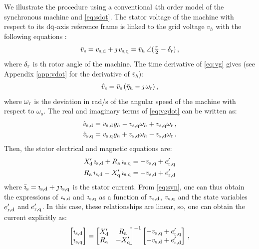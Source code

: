 \documentclass[journal, twocolumn, letter]{IEEEtran}
\newcommand{\dx}[1]{#1_{\rm d}}
\newcommand{\qx}[1]{#1_{\rm q}}
\newcommand{\ds}[1]{#1_{\rm s, d}}
\newcommand{\qs}[1]{#1_{\rm s, q}}
\newcommand{\dr}[1]{#1_{\rm r, d}}
\newcommand{\qr}[1]{#1_{\rm r, q}}
\newcommand{\vh}{v_h}
\newcommand{\dg}{\delta_{\rm r}}
\newcommand{\wg}{\omega_{\rm r}}
\newcommand{\vg}{\bar{v}_{\rm s}}
\newcommand{\vgdot}{\dot{\bar{v}}_{\rm s}}
\newcommand{\ig}{\bar{\ii}_{\rm s}}
\newcommand{\vhbar}{\bar{v}_h}
\newcommand{\etah}{\bar{\eta}_h}
\newcommand{\rhoh}{\varrho_h}
\newcommand{\wh}{\omega_h}
\newcommand{\wo}{\omega_o}
\newcommand{\ii}{\imath}
\newcommand{\jj}{\jmath}
\begin{document}
We illustrate the procedure using a conventional 4th order model of
the synchronous machine and \eqref{eq:sdot}.  The stator voltage of
the machine with respect to its $\rm dq$-axis reference frame is
linked to the grid voltage $\vh$ with the following equations
\cite{Sauer:1998}:
\begin{equation}
  \label{eq:vg}
  \vg = \ds{v} + \jj \, \qs{v} =
  \vhbar \, \angle (\tfrac{\pi}{2} - \dg) \, ,
\end{equation}
where $\dg$ is th rotor angle of the machine.  The time derivative of
\eqref{eq:vg} gives (see Appendix \ref{app:vdot} for the derivative of
$\vhbar$):
\begin{equation}
  \label{eq:vgdot}
  \vgdot = \vg \, (\etah - \jj \, \wg) \, ,   
\end{equation}
where $\wg$ is the deviation in rad/s of the angular speed of the
machine with respect to $\wo$.   The real and imaginary
terms of \eqref{eq:vgdot} can be written as:
\begin{equation}
  \label{eq:vgdot2}
  \begin{aligned}
    \ds{\dot{v}} &= \ds{v} \rhoh - \qs{v} \wh + \qs{v} \wg \, , \\
    \qs{\dot{v}} &= \qs{v} \rhoh + \ds{v} \wh - \ds{v} \wg \, . \\    
  \end{aligned}
\end{equation}
Then, the stator electrical and magnetic equations are:
\begin{equation}
  \label{eq:syn}
  \begin{aligned}
    \dx{X}' \, \ds{\ii} + R_{\rm a} \, \qs{\ii}  &= - \qs{v} + \qr{e'} \\
R_{\rm a} \, \ds{\ii} - \qx{X}' \, \qs{\ii} &= - \ds{v} + \dr{e'}
\end{aligned}
\end{equation}
where $\ig = \ds{\ii} + \jj \, \qs{\ii}$ is the stator current.  From
\eqref{eq:syn}, one can thus obtain the expressions of $\ds{\ii}$ and
$\qs{\ii}$ as a function of $\ds{v}$, $\qs{v}$ and the state variables
$\dr{e'}$ and $\qr{e'}$.  In this case, these relationships are
linear, so, one can obtain the current explicitly as:
\begin{equation}
  \label{eq:syn2a}
  \begin{bmatrix}
    \ds{\ii} \\ \qs{\ii}
  \end{bmatrix}
  =
  \begin{bmatrix}
    \dx{X}' & R_{\rm a} \\
    R_{\rm a} & -\qx{X}'
  \end{bmatrix}^{-1}
  \begin{bmatrix}
    - \qs{v} + \qr{e'} \\
    - \ds{v} + \dr{e'}
  \end{bmatrix} \, ,
\end{equation}
\end{document}
